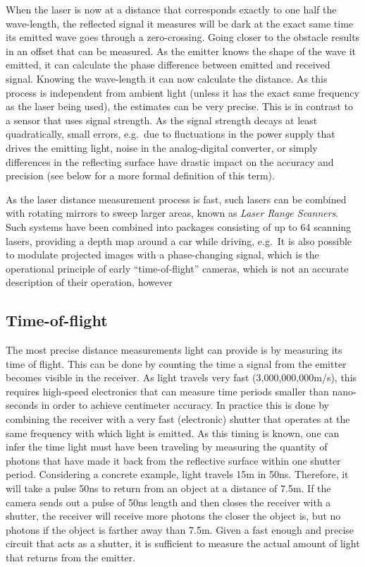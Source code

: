 When the laser is now at a distance that corresponds exactly to one half the wave-length, the reflected signal it measures will be dark at the exact same time its emitted wave goes through a zero-crossing. Going closer to the obstacle results in an offset that can be measured. As the emitter knows the shape of the wave it emitted, it can calculate the phase difference between emitted and received signal. Knowing the wave-length it can now calculate the distance. As this process is independent from ambient light (unless it has the exact same frequency as the laser being used), the estimates can be very precise. This is in contrast to a sensor that uses signal strength. As the signal strength decays at least quadratically, small errors, e.g.\ due to fluctuations in the power supply that drives the emitting light, noise in the analog-digital converter, or simply differences in the reflecting surface have drastic impact on the accuracy and precision (see below for a more formal definition of this term).

As the laser distance measurement process is fast, such lasers can be combined with rotating mirrors to sweep larger areas, known as \emph{Laser Range Scanners}. Such systems have been combined into packages consisting of up to 64 scanning lasers, providing a depth map around a car while driving, e.g.\ It is also possible to modulate projected images with a phase-changing signal, which is the operational principle of early ``time-of-flight'' cameras, which is not an accurate description of their operation, however

\subsection{Time-of-flight}
The most precise distance measurements light can provide is by measuring its time of flight. This can be done by counting the time a signal from the emitter becomes visible in the receiver. As light travels very fast (3,000,000,000m/s), this requires high-speed electronics that can measure time periods smaller than nano-seconds in order to achieve centimeter accuracy. In practice this is done by combining the receiver with a very fast (electronic) shutter that operates at the same frequency with which light is emitted. As this timing is known, one can infer the time light must have been traveling by measuring the quantity of photons that have made it back from the reflective surface within one shutter period. Considering a concrete example, light travels 15m in 50ns. Therefore, it will take a pulse 50ns to return from an object at a distance of 7.5m. If the camera sends out a pulse of 50ns length and then closes the receiver with a shutter, the receiver will receive more photons the closer the object is, but no photons if the object is farther away than 7.5m. Given a fast enough and precise circuit that acts as a shutter, it is sufficient to measure the actual amount of light that returns from the emitter.


